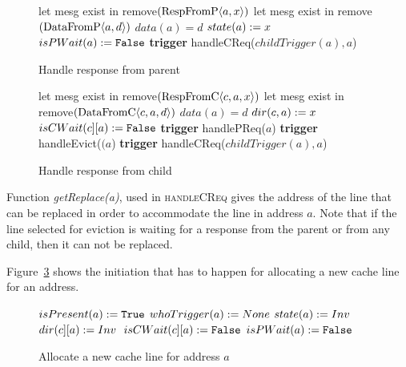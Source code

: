 \begin{figure}
\begin{algorithmic}
   \State let mesg  exist in 
   \State remove$(\text{RespFromP$\langle a,x\rangle$})$
      \State let mesg  exist in 
      \State remove$(\text{DataFromP$\langle a,d\rangle$})$
      \State $data(a) = d$
   \EndIf
   \State $state(a) := x$
   \State $isPWait(a) := \texttt{False}$ 
   \State \textcolor{trig-color}{\textbf{trigger} handleCReq($childTrigger(a), a$)}
\EndRule
\end{algorithmic}
\caption{Handle response from parent}
\label{alg:handlePResp}
\end{figure}

\begin{figure}
\begin{algorithmic}
   \State let mesg  exist in 
   \State remove$(\text{RespFromC$\langle c,a,x\rangle$})$
      \State let mesg  exist in 
      \State remove$(\text{DataFromC$\langle c,a,d\rangle$})$
      \State $data(a) = d$
   \EndIf
   \State $dir(c,a) := x$
   \If {$isCWait(c][a) \AndAnd cWait(c][a) >= x$}
     \State $isCWait(c][a) := \texttt{False}$
   \EndIf
   {\color{trig-color}
      \State \textbf{trigger} handlePReq($a$)
      \State \textbf{trigger} handleEvict($(a$)
      \State \textbf{trigger} handleCReq($childTrigger(a), a$)
   \EndIf}
\EndRule
\end{algorithmic}
\caption{Handle response from child}
\label{alg:handleCResp}
\end{figure}

Function \emph{getReplace(a)}, used in \textsc{handleCReq} gives the address of
the line that can be replaced in order to accommodate the line in address $a$.
Note that if the line selected for eviction is waiting for a response from the
parent or from any child, then it can not be replaced.

Figure~\ref{alg:allocLine} shows the initiation that has to happen for
allocating a new cache line for an address.

\begin{figure}
\begin{algorithmic}
  \State $isPresent(a) := \texttt{True}$
  \State \textcolor{trig-color}{$whoTrigger(a) := None$}
  \State $state(a) := \text{$Inv$}\;$
     \State $dir(c][a) := \text{$Inv$}\;$
     \State $isCWait(c][a) := \texttt{False}$
  \EndFor
  \State $isPWait(a) := \texttt{False}$
\EndProcedure
\end{algorithmic}
\caption{Allocate a new cache line for address $a$}
\label{alg:allocLine}
\end{figure}

